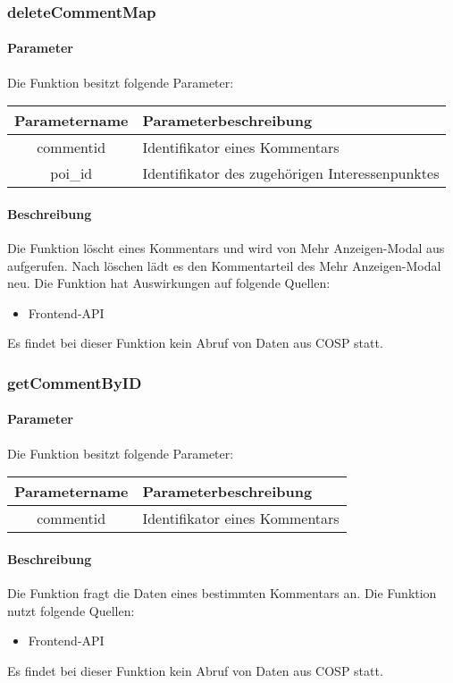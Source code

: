\subsubsection{deleteCommentMap}
\paragraph{Parameter} Die Funktion besitzt folgende Parameter:
\begin{table}[H]
	\begin{tabular}{|c|p{11cm}|}
		\hline
		\textbf{Parametername} & \textbf{Parameterbeschreibung} \\ \hline
		commentid & Identifikator eines Kommentars \\ \hline
		poi\_id   & Identifikator des zugehörigen Interessenpunktes \\ \hline
	\end{tabular}
\end{table}
\paragraph{Beschreibung} Die Funktion löscht eines Kommentars und wird von {\glqq Mehr Anzeigen\grqq}-Modal aus aufgerufen. Nach löschen lädt es den Kommentarteil des {\glqq Mehr Anzeigen\grqq}-Modal neu. Die Funktion hat Auswirkungen auf folgende Quellen:
\begin{itemize}
	\item Frontend-API
\end{itemize}
Es findet bei dieser Funktion kein Abruf von Daten aus {\glqq COSP\grqq} statt.
\subsubsection{getCommentByID}
\paragraph{Parameter} Die Funktion besitzt folgende Parameter:
\begin{table}[H]
	\begin{tabular}{|c|p{11cm}|}
		\hline
		\textbf{Parametername} & \textbf{Parameterbeschreibung} \\ \hline
		commentid & Identifikator eines Kommentars \\ \hline
	\end{tabular}
\end{table}
\paragraph{Beschreibung} Die Funktion fragt die Daten eines bestimmten Kommentars an. Die Funktion nutzt folgende Quellen:
\begin{itemize}
	\item Frontend-API
\end{itemize}
Es findet bei dieser Funktion kein Abruf von Daten aus {\glqq COSP\grqq} statt.
